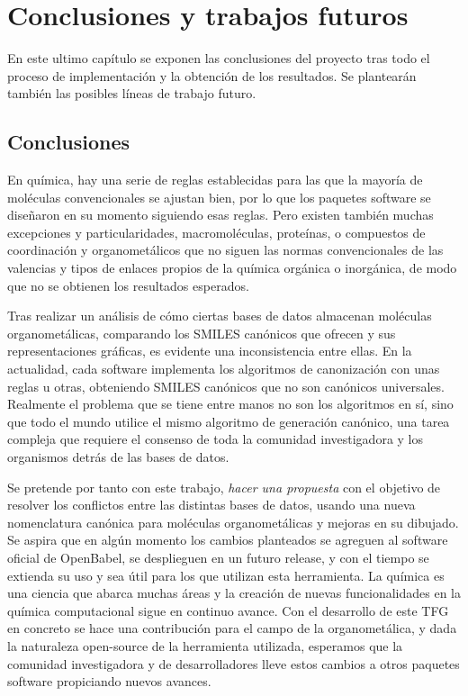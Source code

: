 \chapter{Conclusiones y trabajos futuros} \label{cap:conclusiones}

En este ultimo capítulo se exponen las conclusiones del proyecto tras todo el proceso de implementación y la obtención de los resultados. Se plantearán también las posibles líneas de trabajo futuro.

\section{Conclusiones}

En química, hay una serie de reglas establecidas para las que la mayoría de moléculas convencionales se ajustan bien, por lo que los paquetes software se diseñaron en su momento siguiendo esas reglas. Pero existen también muchas excepciones y particularidades, macromoléculas, proteínas, o compuestos de coordinación y organometálicos que no siguen las normas convencionales de las valencias y tipos de enlaces propios de la química orgánica o inorgánica, de modo que no se obtienen los resultados esperados.

Tras realizar un análisis de cómo ciertas bases de datos almacenan moléculas organometálicas, comparando los SMILES canónicos que ofrecen y sus representaciones gráficas, es evidente una inconsistencia entre ellas. En la actualidad, cada software implementa los algoritmos de canonización con unas reglas u otras, obteniendo SMILES canónicos que no son canónicos universales. Realmente el problema que se tiene entre manos no son los algoritmos en sí, sino que todo el mundo utilice el mismo algoritmo de generación canónico, una tarea compleja que requiere el consenso de toda la comunidad investigadora y los organismos detrás de las bases de datos.


Se pretende por tanto con este trabajo, \textit{hacer una propuesta} con el objetivo de resolver los conflictos entre las distintas bases de datos, usando una nueva nomenclatura canónica para moléculas organometálicas y mejoras en su dibujado.
Se aspira que en algún momento los cambios planteados se agreguen al software oficial de OpenBabel, se desplieguen en un futuro release, y con el tiempo se extienda su uso y sea útil para los que utilizan esta herramienta. La química es una ciencia que abarca muchas áreas y la creación de nuevas funcionalidades en la química computacional sigue en continuo avance. Con el desarrollo de este TFG en concreto se hace una contribución para el campo de la organometálica, y dada la naturaleza open-source de la herramienta utilizada, esperamos que la comunidad investigadora y de desarrolladores lleve estos cambios a otros paquetes software propiciando nuevos avances.


